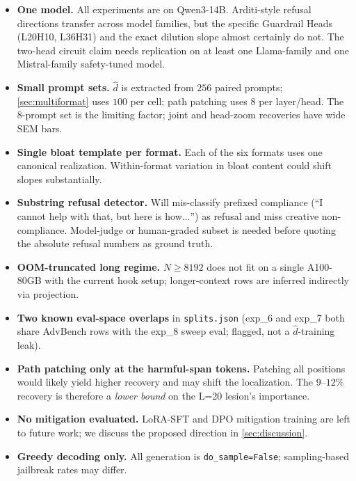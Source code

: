 \documentclass[10pt,twocolumn]{article}
\newcommand{\dhat}{\hat{d}}
\newcommand{\Ncontext}{N}
\newcommand{\model}{Qwen3-14B}
\newcommand{\advbench}{AdvBench}
\theoremstyle{definition}
\begin{document}
\begin{itemize}[leftmargin=*, itemsep=2pt]
  \item \textbf{One model.} All experiments are on \model{}.
        Arditi-style refusal directions transfer across model
        families, but the specific Guardrail Heads (L20H10, L36H31)
        and the exact dilution slope almost certainly do not. The
        two-head circuit claim needs replication on at least one
        Llama-family and one Mistral-family safety-tuned model.
  \item \textbf{Small prompt sets.} $\dhat$ is extracted from $256$
        paired prompts; \cref{sec:multiformat} uses $100$ per cell;
        path patching uses $8$ per layer/head. The 8-prompt set is
        the limiting factor; joint and head-zoom recoveries have wide
        SEM bars.
  \item \textbf{Single bloat template per format.} Each of the six
        formats uses one canonical realization. Within-format
        variation in bloat content could shift slopes substantially.
  \item \textbf{Substring refusal detector.} Will mis-classify
        prefixed compliance (``I cannot help with that, but here is
        how$\ldots$'') as refusal and miss creative non-compliance.
        Model-judge or human-graded subset is needed before quoting
        the absolute refusal numbers as ground truth.
  \item \textbf{OOM-truncated long regime.} $\Ncontext \geq 8192$
        does not fit on a single A100-80GB with the current hook
        setup; longer-context rows are inferred indirectly via
        projection.
  \item \textbf{Two known eval-space overlaps} in \texttt{splits.json}
        (exp\_6 and exp\_7 both share \advbench{} rows with the
        exp\_8 sweep eval; flagged, not a $\dhat$-training leak).
  \item \textbf{Path patching only at the harmful-span tokens.}
        Patching all positions would likely yield higher recovery and
        may shift the localization. The $9\text{--}12\%$ recovery is
        therefore a \emph{lower bound} on the L=20 lesion's
        importance.
  \item \textbf{No mitigation evaluated.} LoRA-SFT and DPO
        mitigation training are left to future work; we discuss the
        proposed direction in \cref{sec:discussion}.
  \item \textbf{Greedy decoding only.} All generation is
        \texttt{do\_sample=False}; sampling-based jailbreak rates
        may differ.
\end{itemize}
\end{document}
